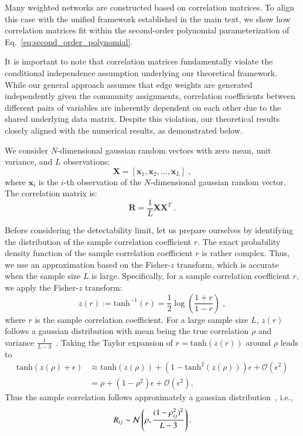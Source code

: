 \documentclass[a4paper,pre,superscriptaddress,floatfix,nofootinbib,twocolumn]{revtex4-1}
\begin{document}
Many weighted networks are constructed based on correlation matrices. To align this case with the unified framework established in the main text, we show how correlation matrices fit within the second-order polynomial parameterization of Eq.~\eqref{eq:second_order_polynomial}.

It is important to note that correlation matrices fundamentally violate the conditional independence assumption underlying our theoretical framework. While our general approach assumes that edge weights are generated independently given the community assignments, correlation coefficients between different pairs of variables are inherently dependent on each other due to the shared underlying data matrix. Despite this violation, our theoretical results closely aligned with the numerical results, as demonstrated below.

We consider $N$-dimensional gaussian random vectors with zero mean, unit variance, and $L$ observations:
\begin{equation}
\mathbf{X} = \left[ \mathbf{x}_1, \mathbf{x}_2, \ldots, \mathbf{x}_L \right] \; ,
\end{equation}
where $\mathbf{x}_i$ is the $i$-th observation of the $N$-dimensional gaussian random vector. The correlation matrix is:
\begin{equation}
    \mathbf{R} = \frac{1}{L} \mathbf{X} \mathbf{X}^T \; .
\end{equation}

Before considering the detectability limit, let us prepare ourselves by identifying the distribution of the sample correlation coefficient $r$.
The exact probability density function of the sample correlation coefficient $r$ is rather complex. Thus, we use an approximation based on the Fisher-$z$ transform, which is accurate when the sample size $L$ is large. Specifically, for a sample correlation coefficient $r$, we apply the Fisher-$z$ transform:
\begin{equation}
    z(r) := \text{tanh}^{-1}(r) = \frac{1}{2} \log \left( \frac{1+r}{1-r} \right) \; ,
\end{equation}
where $r$ is the sample correlation coefficient.
For a large sample size $L$, $z(r)$ follows a gaussian distribution with mean being the true correlation $\rho$ and variance $\frac{1}{L-3}$~\cite{hotelling1953new}.
Taking the Taylor expansion of $r=\text{tanh}(z(r))$ around $\rho$ leads to
\begin{align}
    \text{tanh}(z(\rho) + \epsilon) &\approx \text{tanh}(z(\rho)) + (1-\text{tanh}^2(z(\rho))) \epsilon + \mathcal{O}(\epsilon^2) \nonumber \\
    &=\rho + (1-\rho^2) \epsilon + \mathcal{O}(\epsilon^2),
\end{align}
Thus the sample correlation follows approximately a gaussian distribution~\cite{hotelling1953new}, i.e.,
\begin{equation}
    R_{ij} \sim {\cal N}\left(\rho, \frac{(1-\rho^2_{ij})^2}{L-3}\right). \label{eq:hotelling_dist}
\end{equation}
\end{document}
